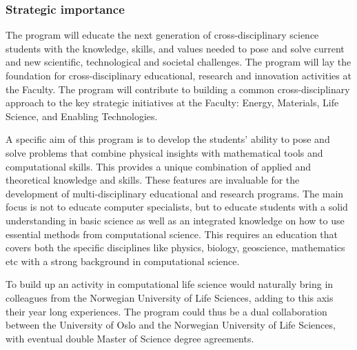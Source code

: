 \documentclass{beamer}
\begin{document}
\begin{frame}
\frametitle{Strategic importance}

The program will educate the next generation of cross-disciplinary
science students with the knowledge, skills, and values needed to pose
and solve current and new scientific, technological and societal
challenges. The program will lay the foundation for cross-disciplinary
educational, research and innovation activities at the Faculty. The
program will contribute to building a common cross-disciplinary
approach to the key strategic initiatives at the Faculty: Energy,
Materials, Life Science, and Enabling Technologies.

A specific aim of this program is to develop the students' ability to pose and
solve problems that combine physical insights with mathematical tools
and computational skills. This provides a unique combination
of applied and theoretical knowledge and skills. These features are invaluable
for the development of multi-disciplinary educational and research programs.
The main focus is not to educate computer
specialists, but to educate students with a solid understanding in basic science
as well as an integrated knowledge on how  to use
essential methods from computational science. This requires an
education that covers both the specific disciplines like physics, biology,
geoscience, mathematics etc with a strong background in computational science.

To build up an activity in computational life science would naturally bring in colleagues from the Norwegian University of Life Sciences,
adding to this axis their year long experiences.
The program could thus be a dual collaboration between the University of Oslo and the Norwegian University of Life Sciences, with eventual
double Master of Science degree agreements.
\end{frame}
\end{document}
